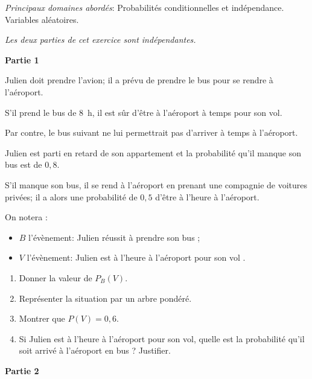 \medskip

\emph{Principaux domaines abordés}: Probabilités conditionnelles et indépendance. Variables aléatoires.

\medskip

\begin{center}\emph{Les deux parties de cet exercice sont indépendantes.}\end{center}

\textbf{Partie 1}

\medskip

Julien doit prendre l'avion; il a prévu de prendre le bus pour se rendre à l'aéroport. 

S'il prend le bus de $8$~h, il est sûr d'être à l'aéroport à temps pour son vol.

Par contre, le bus suivant ne lui permettrait pas d'arriver à temps à l'aéroport.

Julien est parti en retard de son appartement et la probabilité qu'il manque son bus est de $0,8$.

S'il manque son bus, il se rend à l'aéroport en prenant une compagnie de voitures privées; il a alors une probabilité de $0,5$ d'être à l'heure à l'aéroport.

\smallskip

On notera :

\setlength\parindent{12mm}
\begin{itemize}
\item[$\bullet~~$] $B$ l'évènement: \og Julien réussit à prendre son bus \fg ;
\item[$\bullet~~$] $V$ l'évènement: \og Julien est à l'heure à l'aéroport pour son vol \fg.
\end{itemize}
\setlength\parindent{0mm}

\medskip

\begin{enumerate}
\item Donner la valeur de $P_B(V)$.
\item Représenter la situation par un arbre pondéré.
\item Montrer que $P(V) = 0,6$.
\item Si Julien est à l'heure à l'aéroport pour son vol, quelle est la probabilité qu'il soit arrivé à l'aéroport en bus ? Justifier.
\end{enumerate}

\bigskip

\textbf{Partie 2}

\medskip

